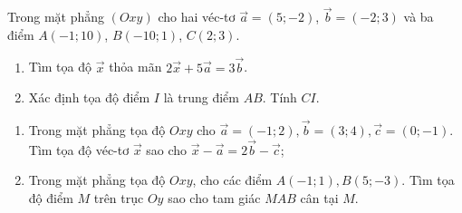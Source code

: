 \begin{bt}%
	Trong mặt phẳng $(Oxy)$ cho hai véc-tơ $\overrightarrow{a}=(5;-2)$, $\overrightarrow{b}=(-2;3)$ và ba điểm  $A(-1;10)$, $B(-10;1)$, $C(2;3)$.
	\begin{enumerate}
		\item Tìm tọa độ $\overrightarrow{x}$ thỏa mãn $2\overrightarrow{x}+5\overrightarrow{a}=3\overrightarrow{b}$.
		\item Xác định tọa độ điểm $I$ là trung điểm $AB$. Tính $CI$.
	\end{enumerate}
\end{bt}

\begin{bt}%
	\begin{enumerate}
	\item Trong mặt phẳng tọa độ $Oxy$ cho $\overrightarrow{a}=(-1;2), \overrightarrow{b}=(3;4), \overrightarrow{c}=(0;-1)$. Tìm tọa độ véc-tơ $\overrightarrow{x}$ sao cho $\overrightarrow{x}-\overrightarrow{a}=2\overrightarrow{b}-\overrightarrow{c}$;
	\item Trong mặt phẳng tọa độ $Oxy$, cho các điểm $A(-1;1), B(5;-3)$. Tìm tọa độ điểm $M$ trên trục $Oy$ sao cho tam giác $MAB$ cân tại $M$.		
	\end{enumerate}
\end{bt}

